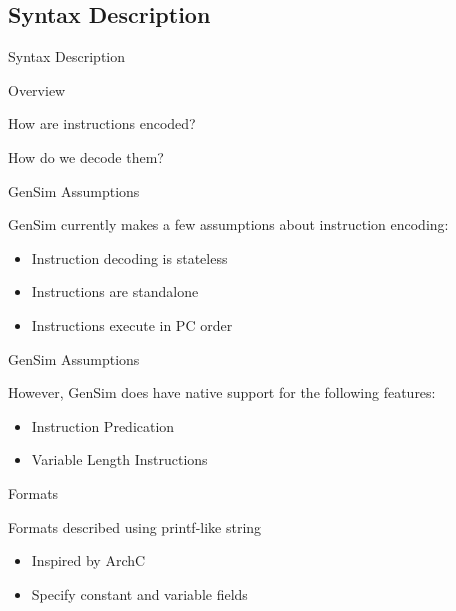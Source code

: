 \subsection{Syntax Description}

\begin{frame}{Syntax Description}
\end{frame}

\begin{frame}{Overview}

How are instructions encoded?

How do we decode them?

\end{frame}

\begin{frame}{GenSim Assumptions}

GenSim currently makes a few assumptions about instruction encoding:
\begin{itemize}
\item Instruction decoding is stateless
\item Instructions are standalone
\item Instructions execute in PC order
\end{itemize}

\end{frame}

\begin{frame}{GenSim Assumptions}

However, GenSim does have native support for the following features:
\begin{itemize}
\item Instruction Predication
\item Variable Length Instructions
\end{itemize}

\end{frame}


\begin{frame}{Formats}

Formats described using printf-like string
\begin{itemize}
\item Inspired by ArchC
\item Specify constant and variable fields
\end{itemize}

\end{frame}

